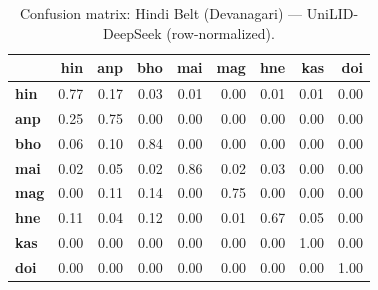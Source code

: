 \begin{table}[htbp]
\centering
\small
\begin{tabular}{lrrrrrrrr}
\toprule
 & \textbf{hin} & \textbf{anp} & \textbf{bho} & \textbf{mai} & \textbf{mag} & \textbf{hne} & \textbf{kas} & \textbf{doi} \\
\midrule
\textbf{hin} & \cellcolor{blue!77}\color{white}0.77 & \cellcolor{blue!16}0.17 & \cellcolor{blue!2}0.03 & \cellcolor{blue!0}0.01 & \cellcolor{blue!0}0.00 & \cellcolor{blue!0}0.01 & \cellcolor{blue!0}0.01 & \cellcolor{blue!0}0.00 \\
\textbf{anp} & \cellcolor{blue!25}0.25 & \cellcolor{blue!75}\color{white}0.75 & \cellcolor{blue!0}0.00 & \cellcolor{blue!0}0.00 & \cellcolor{blue!0}0.00 & \cellcolor{blue!0}0.00 & \cellcolor{blue!0}0.00 & \cellcolor{blue!0}0.00 \\
\textbf{bho} & \cellcolor{blue!5}0.06 & \cellcolor{blue!10}0.10 & \cellcolor{blue!83}\color{white}0.84 & \cellcolor{blue!0}0.00 & \cellcolor{blue!0}0.00 & \cellcolor{blue!0}0.00 & \cellcolor{blue!0}0.00 & \cellcolor{blue!0}0.00 \\
\textbf{mai} & \cellcolor{blue!1}0.02 & \cellcolor{blue!5}0.05 & \cellcolor{blue!1}0.02 & \cellcolor{blue!86}\color{white}0.86 & \cellcolor{blue!1}0.02 & \cellcolor{blue!3}0.03 & \cellcolor{blue!0}0.00 & \cellcolor{blue!0}0.00 \\
\textbf{mag} & \cellcolor{blue!0}0.00 & \cellcolor{blue!10}0.11 & \cellcolor{blue!14}0.14 & \cellcolor{blue!0}0.00 & \cellcolor{blue!75}\color{white}0.75 & \cellcolor{blue!0}0.00 & \cellcolor{blue!0}0.00 & \cellcolor{blue!0}0.00 \\
\textbf{hne} & \cellcolor{blue!10}0.11 & \cellcolor{blue!3}0.04 & \cellcolor{blue!12}0.12 & \cellcolor{blue!0}0.00 & \cellcolor{blue!1}0.01 & \cellcolor{blue!67}\color{white}0.67 & \cellcolor{blue!4}0.05 & \cellcolor{blue!0}0.00 \\
\textbf{kas} & \cellcolor{blue!0}0.00 & \cellcolor{blue!0}0.00 & \cellcolor{blue!0}0.00 & \cellcolor{blue!0}0.00 & \cellcolor{blue!0}0.00 & \cellcolor{blue!0}0.00 & \cellcolor{blue!100}\color{white}1.00 & \cellcolor{blue!0}0.00 \\
\textbf{doi} & \cellcolor{blue!0}0.00 & \cellcolor{blue!0}0.00 & \cellcolor{blue!0}0.00 & \cellcolor{blue!0}0.00 & \cellcolor{blue!0}0.00 & \cellcolor{blue!0}0.00 & \cellcolor{blue!0}0.00 & \cellcolor{blue!100}\color{white}1.00 \\
\bottomrule
\end{tabular}
\caption{Confusion matrix: Hindi Belt (Devanagari) — UniLID-DeepSeek (row-normalized).}
\label{tab:cm-hindi_belt-unilid-deepseek}
\end{table}

